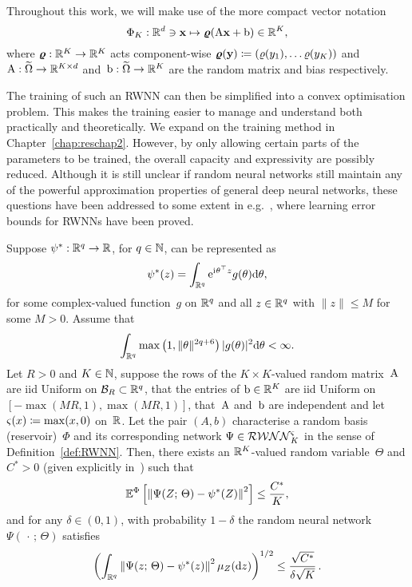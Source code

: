 \begin{remark}
Throughout this work, we will make use of the more compact vector notation
$$
\Phi_K: \mathbb{R}^d \ni \boldsymbol{\mathrm{x}}\mapsto \boldsymbol\varrho(\mathrm{A} \mathbf{x}+\mathrm{b}) \in \mathbb{R}^{K},
$$
where $\boldsymbol\varrho:\mathbb{R}^K\rightarrow\mathbb{R}^K$ acts component-wise $\boldsymbol\varrho(\boldsymbol{\mathrm{y}})\coloneqq(\varrho(y_1), \dots \varrho(y_K))$ and~${\mathrm{A}: \widetilde{\Omega} \rightarrow \mathbb{R}^{K\times d}}$ and~${\mathrm{b}: \widetilde{\Omega} \rightarrow \mathbb{R}^K}$ are the random matrix and bias respectively.
\end{remark}

The training of such an RWNN can then be simplified into a convex optimisation problem. This makes the training easier to manage and understand both practically and theoretically. We expand on the training method in Chapter~\ref{chap:reschap2}. However, by only allowing certain parts of the parameters to be trained, the overall capacity and expressivity are possibly reduced. Although it is still unclear if random neural networks still maintain any of the powerful approximation properties of general deep neural networks, these questions have been addressed to some extent in e.g.~\cite{Gonon2020ApproximationSystems, Mei2022GeneralizationConcentration}, where learning error bounds for RWNNs have been proved.

\begin{proposition}\label{prop:UATRWNN}
Suppose $\psi^{*}: \mathbb{R}^{q} \rightarrow \mathbb{R}$, for $q\in\mathbb{N}$, can be represented as
$$
\psi^{*}(z)=\int_{\mathbb{R}^{q}} \mathrm{e}^{{\mathrm{i}\mkern1mu}\theta^\top z} g(\theta) \mathrm{d} \theta,
$$
for some complex-valued function~$g$ on $\mathbb{R}^{q}$ and all $z \in \mathbb{R}^{q}$ with $\|z\| \leq M$ for some $M>0$. Assume that
$$
\int_{\mathbb{R}^{q}} \max \left(1,\|\theta \|^{2 q+6}\right)|g(\theta)|^{2} \mathrm{d} \theta <\infty .
$$
Let $R>0$ and $K\in\mathbb{N}$, suppose the rows of the $K\times K$-valued random matrix~$\mathrm{A}$ are iid Uniform on $\mathcal{B}_{R} \subset \mathbb{R}^{q}$, that the entries of $\mathrm{b}\in\mathbb{R}^{K}$ are iid Uniform on~$[-\max (M R, 1), \max (M R, 1)]$, 
that~$\mathrm{A}$ and~$\mathrm{b}$ are independent and let~${\varsigma(x)\coloneqq\max (x, 0)}$ on~$\mathbb{R}$. 
Let the pair $(A,b)$ characterise a random basis (reservoir)~$\Phi$ and its corresponding network $\Psi\in\mathcal{RWNN}^{\varsigma}_K$ in the sense of Definition~\ref{def:RWNN}. 
Then, there exists an $\mathbb{R}^K$-valued random variable~$\Theta$ and $C^{*}>0$ 
(given explicitly in~\cite[Equation~(33)]{Gonon2020ApproximationSystems}) such that
$$
\mathbb{E}^\Phi\left[\left\|\Psi(Z;\, \Theta)-\psi^{*}(Z)\right\|^{2}\right] \leq \frac{C^{*}}{K},
$$
and for any $\delta \in(0,1)$, with probability $1-\delta$ the random neural network $\Psi(\,\cdot\,;\,\Theta)$ satisfies
$$
\left(\int_{\mathbb{R}^{q}}\left\|\Psi(z;\, \Theta)-\psi^{*}(z)\right\|^{2} \mu_{Z}(\mathrm{d} z)\right)^{1 / 2} \leq \frac{\sqrt{C^{*}}}{\delta \sqrt{K}}\,.
$$
\end{proposition}

